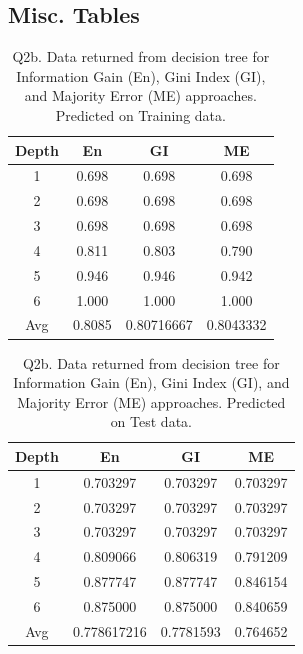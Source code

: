 \documentclass[12pt, fullpage,letterpaper]{article}
\begin{document}
\subsection{Misc. Tables}

\begin{table}[h]
	\centering
	\begin{tabular}{c|ccc}
		Depth & En & GI & ME \\ 
		\hline\hline
		1 &  0.698 & 0.698 & 0.698 \\ \hline
		2 &  0.698 & 0.698 & 0.698 \\ \hline
		3 &  0.698 & 0.698 & 0.698 \\ \hline
		4 &  0.811 & 0.803 & 0.790 \\ \hline
        5 &  0.946 & 0.946 & 0.942 \\ \hline
        6 &  1.000 & 1.000 & 1.000 \\ \hline
        \hline
        Avg & 0.8085 & 0.80716667 & 0.8043332

	\end{tabular}
	\caption{Q2b. Data returned from decision tree for Information Gain (En), Gini Index (GI), and Majority Error (ME) approaches. Predicted on Training data.}
\end{table}

\begin{table}[h]
	\centering
	\begin{tabular}{c|ccc}
		Depth & En & GI & ME \\ 
		\hline\hline
		1 &  0.703297 & 0.703297 & 0.703297 \\ \hline
		2 &  0.703297 & 0.703297 & 0.703297 \\ \hline
		3 &  0.703297 & 0.703297 & 0.703297 \\ \hline
		4 &  0.809066 & 0.806319 & 0.791209 \\ \hline
        5 &  0.877747 & 0.877747 & 0.846154 \\ \hline
        6 &  0.875000 & 0.875000 & 0.840659 \\ \hline
        \hline
        Avg & 0.778617216 & 0.7781593 & 0.764652

	\end{tabular}
	\caption{Q2b. Data returned from decision tree for Information Gain (En), Gini Index (GI), and Majority Error (ME) approaches. Predicted on Test data.}
\end{table}
\end{document}
